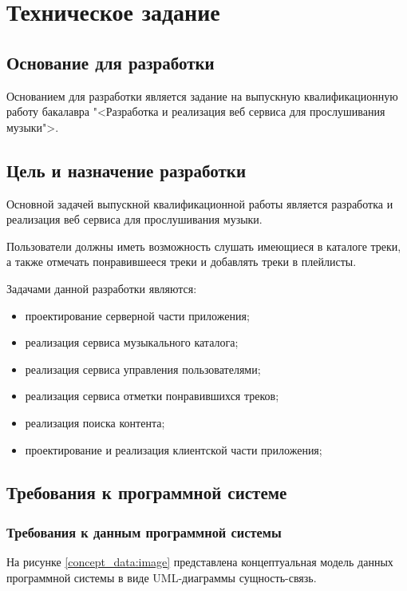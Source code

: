 \section{Техническое задание}
\subsection{Основание для разработки}

Основанием для разработки является задание на выпускную квалификационную работу бакалавра "<Разработка и реализация веб сервиса для прослушивания музыки">.

\subsection{Цель и назначение разработки}

Основной задачей выпускной квалификационной работы является разработка и реализация веб сервиса для прослушивания музыки.

Пользователи должны иметь возможность слушать имеющиеся в каталоге треки, а также отмечать понравившееся треки и добавлять треки в плейлисты.

Задачами данной разработки являются:
\begin{itemize}
\item проектирование серверной части приложения;
\item реализация сервиса музыкального каталога;
\item реализация сервиса управления пользователями;
\item реализация сервиса отметки понравившихся треков;
\item реализация поиска контента;
\item проектирование и реализация клиентской части приложения;
\end{itemize}

\subsection{Требования к программной системе}

\subsubsection{Требования к данным программной системы}

На рисунке \ref{concept_data:image} представлена концептуальная модель данных программной системы в виде UML-диаграммы сущность-связь\cite{uml}.


